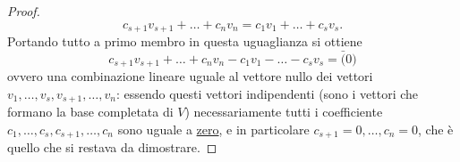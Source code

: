 \begin{proof}
  \begin{equation*}
    c_{s+1}v_{s+1}+\dots+c_nv_n=c_1v_1+\dots+c_sv_s.
  \end{equation*}
  Portando tutto a primo membro in questa uguaglianza si ottiene
  \begin{equation*}
    c_{s+1}v_{s+1}+\dots+c_nv_n-c_1v_1-\dots-c_sv_s=\bar(0)
  \end{equation*}
  ovvero una combinazione lineare uguale al vettore nullo dei vettori $v_1,\dots,v_s,v_{s+1},\dots,v_n$:
  essendo questi vettori indipendenti (sono i vettori che formano la base completata di $V$) necessariamente tutti
  i coefficiente $c_1,\dots,c_s,c_{s+1},\dots,c_n$ sono uguale a \underline{zero}, e in particolare $c_{s+1}=0,
  \dots,c_n=0$, che è quello che si restava da dimostrare.

\end{proof}
